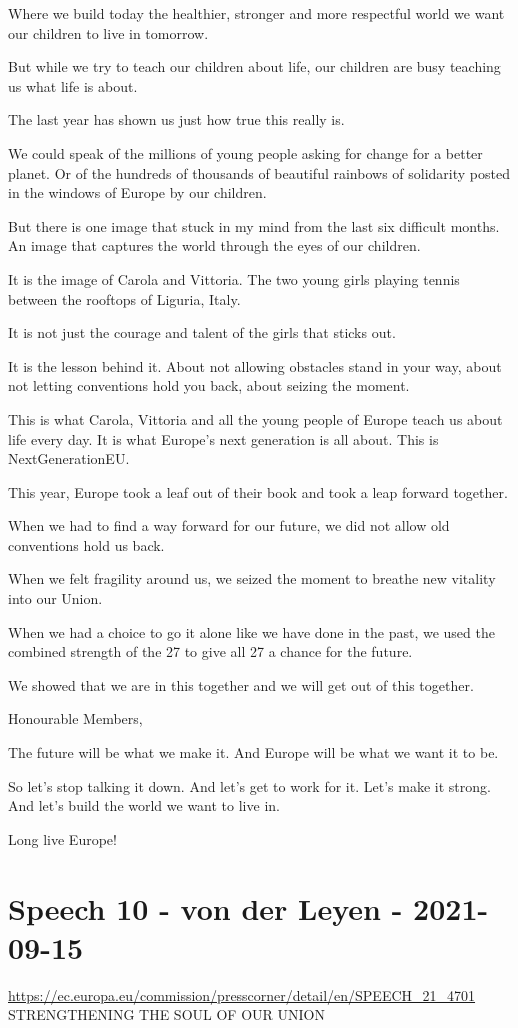 \documentclass[a4paper,11pt]{article}
\begin{document}
Where we build today the healthier, stronger and more respectful world we want our children to live in tomorrow. 

But while we try to teach our children about life, our children are busy teaching us what life is about.

The last year has shown us just how true this really is.

We could speak of the millions of young people asking for change for a better planet.
Or of the hundreds of thousands of beautiful rainbows of solidarity posted in the windows of Europe by our children.

But there is one image that stuck in my mind from the last six difficult months. An image that captures the world through the eyes of our children.

It is the image of Carola and Vittoria. The two young girls playing tennis between the rooftops of Liguria, Italy.

It is not just the courage and talent of the girls that sticks out.

It is the lesson behind it. About not allowing obstacles stand in your way, about not letting conventions hold you back, about seizing the moment.

This is what Carola, Vittoria and all the young people of Europe teach us about life every day. It is what Europe's next generation is all about. This is NextGenerationEU.

This year, Europe took a leaf out of their book and took a leap forward together.

When we had to find a way forward for our future, we did not allow old conventions hold us back. 

When we felt fragility around us, we seized the moment to breathe new vitality into our Union.

When we had a choice to go it alone like we have done in the past, we used the combined strength of the 27 to give all 27 a chance for the future.

We showed that we are in this together and we will get out of this together.

Honourable Members,

The future will be what we make it. And Europe will be what we want it to be.

So let's stop talking it down. And let's get to work for it. Let's make it strong. And let's build the world we want to live in.

Long live Europe!
 \newpage\section{Speech 10 - von der Leyen - 2021-09-15}
\url{https://ec.europa.eu/commission/presscorner/detail/en/SPEECH_21_4701}\\[3mm]
STRENGTHENING THE SOUL OF OUR UNION
\end{document}
